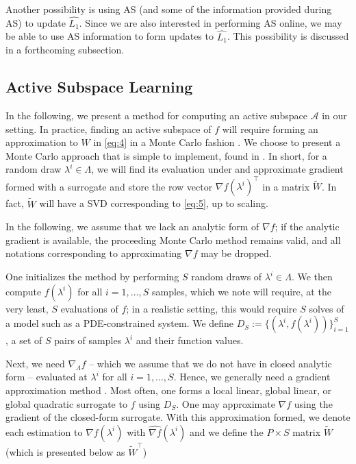 \documentclass{amsart}
\newcommand{\A}{\mathcal{A}}
\begin{document}
Another possibility is using AS (and some of the information provided during AS) to update $\hat{L_1}$. Since we are also interested in performing AS online, we may be able to use AS information to form updates to $\hat{L_1}$. This possibility is discussed in a forthcoming subsection.


\subsection{Active Subspace Learning}

In the following, we present a method for computing an active subspace $\A$ in our setting. In practice, finding an active subspace of $f$ will require forming an approximation to $W$ in \eqref{eq:4} in a Monte Carlo fashion \cite{ConstantineMC}. We choose to present a Monte Carlo approach that is simple to implement, found in \cite{Russi}. In short, for a random draw $\lambda^i \in \Lambda$, we will find its evaluation under and approximate gradient formed with a surrogate and store the row vector $\nabla f(\lambda^i)^\top$ in a matrix $\tilde{W}$. In fact, $\tilde{W}$ will have a SVD corresponding to \eqref{eq:5}, up to scaling.

In the following, we assume that we lack an analytic form of $\nabla f$; if the analytic gradient is available, the proceeding Monte Carlo method remains valid, and all notations corresponding to approximating $\nabla f$ may be dropped.


One initializes the method by performing $S$ random draws of $\lambda^i \in \Lambda$. We then compute $f(\lambda^i)$ for all $i=1,\ldots,S$ samples, which we note will require, at the very least, $S$ evaluations of $f$; in a realistic setting, this would require $S$ solves of a model such as a PDE-constrained system. We define $D_S:=\{(\lambda^i,f(\lambda^i))\}_{i=1}^S$, a set of $S$ pairs of samples $\lambda^i$ and their function values. 

Next, we need $\nabla_\Lambda f$ -- which we assume that we do not have in closed analytic form -- evaluated at $\lambda^i$ for all $i=1,\ldots,S$. Hence, we generally need a gradient approximation method \cite{Constantine2015, Smith}. Most often, one forms a local linear, global linear, or global quadratic surrogate to $f$ using $D_S$. One may approximate $\nabla f$ using the gradient of the closed-form surrogate. With this approximation formed, we denote each estimation to $\nabla f(\lambda^i)$ with $\hat{\nabla f}(\lambda^i)$ and we define the $P \times S$ matrix $\tilde{W}$ (which is presented below as $\tilde{W}^\top$)
\end{document}
